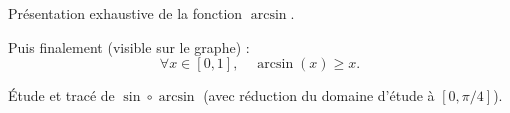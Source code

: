 \documentclass{article}
\begin{document}
\begin{question_kholle}{Présentation exhaustive de la fonction $\arcsin$.}
	\

	Puis finalement (visible sur le graphe) :
	\[
		\forall x \in [0,1], \quad \arcsin(x) \geq x.
	\]
\end{question_kholle}

\begin{question_kholle}{Étude et tracé de $\sin\circ\arcsin$ (avec réduction du domaine d'étude à $[0,\pi/4]$).}
\end{question_kholle}
\end{document}
